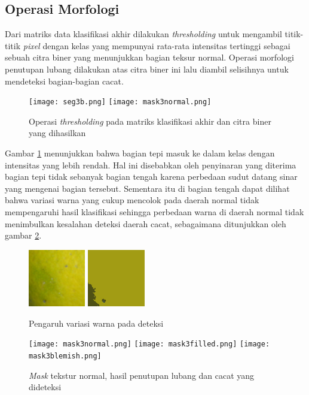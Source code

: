 \documentclass[laporan.tex]{subfiles}
\begin{document}
\subsection{Operasi Morfologi}

Dari matriks data klasifikasi akhir dilakukan \emph{thresholding} untuk mengambil titik-titik \emph{pixel} dengan kelas yang mempunyai rata-rata intensitas tertinggi sebagai sebuah citra biner yang menunjukkan bagian teksur normal. Operasi morfologi penutupan lubang dilakukan atas citra biner ini lalu diambil selisihnya untuk mendeteksi bagian-bagian cacat.

\begin{figure}[h!]
\centering
\texttt{[image: seg3b.png]} \qquad
\texttt{[image: mask3normal.png]}
\caption{Operasi \emph{thresholding} pada matriks klasifikasi akhir dan citra biner yang dihasilkan}
\label{fig:finclassthresh}
\end{figure}

Gambar \ref{fig:finclassthresh} menunjukkan bahwa bagian tepi masuk ke dalam kelas dengan intensitas yang lebih rendah. Hal ini disebabkan oleh penyinaran yang diterima bagian tepi tidak sebanyak bagian tengah karena perbedaan sudut datang sinar yang mengenai bagian tersebut. Sementara itu di bagian tengah dapat dilihat bahwa variasi warna yang cukup mencolok pada daerah normal tidak mempengaruhi hasil klasifikasi sehingga perbedaan warna di daerah normal tidak menimbulkan kesalahan deteksi daerah cacat, sebagaimana ditunjukkan oleh gambar \ref{fig:greenyellow}.%

\begin{figure}[h!]
\centering
\includegraphics[width=2.5cm]{cropgreen1.png} \qquad
\includegraphics[width=2.5cm]{cropgreen2.png}
\caption{Pengaruh variasi warna pada deteksi}
\label{fig:greenyellow}
\end{figure}

\begin{figure}[h!]
\centering
\texttt{[image: mask3normal.png]} \qquad
\texttt{[image: mask3filled.png]} \qquad
\texttt{[image: mask3blemish.png]}
\caption{\emph{Mask} tekstur normal, hasil penutupan lubang dan cacat yang dideteksi}
\end{figure}
\end{document}

